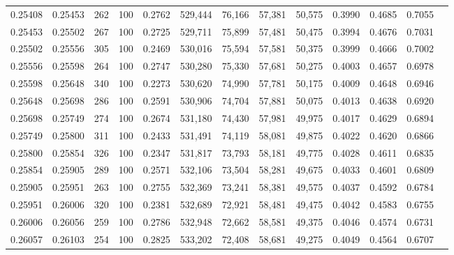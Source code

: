\begin{tabular}{rrrrrrrrrrrrr}
0.25408 & 0.25453 &   262 & 100 &                                     0.2762 & 529,444 &  76,166 &  57,381 &  50,575 & 0.3990 & 0.4685 & 0.7055 \\
0.25453 & 0.25502 &   267 & 100 &                                     0.2725 & 529,711 &  75,899 &  57,481 &  50,475 & 0.3994 & 0.4676 & 0.7031 \\
0.25502 & 0.25556 &   305 & 100 &                                     0.2469 & 530,016 &  75,594 &  57,581 &  50,375 & 0.3999 & 0.4666 & 0.7002 \\
0.25556 & 0.25598 &   264 & 100 &                                     0.2747 & 530,280 &  75,330 &  57,681 &  50,275 & 0.4003 & 0.4657 & 0.6978 \\
0.25598 & 0.25648 &   340 & 100 &                                     0.2273 & 530,620 &  74,990 &  57,781 &  50,175 & 0.4009 & 0.4648 & 0.6946 \\
0.25648 & 0.25698 &   286 & 100 &                                     0.2591 & 530,906 &  74,704 &  57,881 &  50,075 & 0.4013 & 0.4638 & 0.6920 \\
0.25698 & 0.25749 &   274 & 100 &                                     0.2674 & 531,180 &  74,430 &  57,981 &  49,975 & 0.4017 & 0.4629 & 0.6894 \\
0.25749 & 0.25800 &   311 & 100 &                                     0.2433 & 531,491 &  74,119 &  58,081 &  49,875 & 0.4022 & 0.4620 & 0.6866 \\
0.25800 & 0.25854 &   326 & 100 &                                     0.2347 & 531,817 &  73,793 &  58,181 &  49,775 & 0.4028 & 0.4611 & 0.6835 \\
0.25854 & 0.25905 &   289 & 100 &                                     0.2571 & 532,106 &  73,504 &  58,281 &  49,675 & 0.4033 & 0.4601 & 0.6809 \\
0.25905 & 0.25951 &   263 & 100 &                                     0.2755 & 532,369 &  73,241 &  58,381 &  49,575 & 0.4037 & 0.4592 & 0.6784 \\
0.25951 & 0.26006 &   320 & 100 &                                     0.2381 & 532,689 &  72,921 &  58,481 &  49,475 & 0.4042 & 0.4583 & 0.6755 \\
0.26006 & 0.26056 &   259 & 100 &                                     0.2786 & 532,948 &  72,662 &  58,581 &  49,375 & 0.4046 & 0.4574 & 0.6731 \\
0.26057 & 0.26103 &   254 & 100 &                                     0.2825 & 533,202 &  72,408 &  58,681 &  49,275 & 0.4049 & 0.4564 & 0.6707 \\

\end{tabular}
